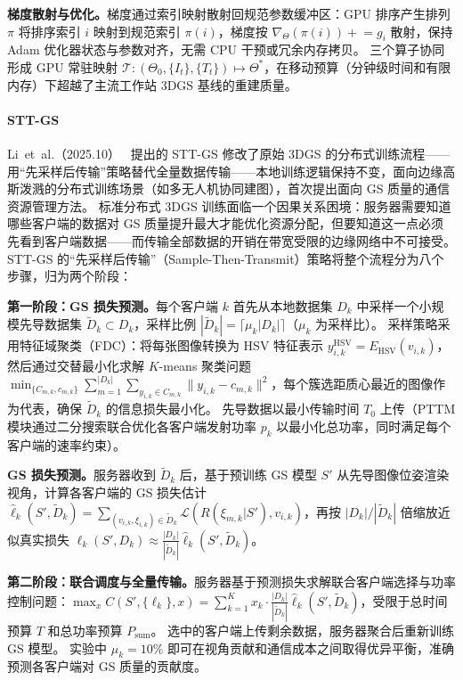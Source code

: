 \textbf{梯度散射与优化。}梯度通过索引映射散射回规范参数缓冲区：GPU 排序产生排列 $\pi$ 将排序索引 $i$ 映射到规范索引 $\pi(i)$，梯度按 $\nabla_\Theta(\pi(i)) \mathrel{+}= g_i$ 散射，保持 Adam 优化器状态与参数对齐，无需 CPU 干预或冗余内存拷贝。
三个算子协同形成 GPU 常驻映射 $\mathcal{T}: (\Theta_0, \{I_t\}, \{T_t\}) \mapsto \Theta^*$，在移动预算（分钟级时间和有限内存）下超越了主流工作站 3DGS 基线的重建质量。

\paragraph{STT-GS}
Li~et~al.（2025.10）~\cite{2510_13186} 提出的 STT-GS 修改了原始 3DGS 的分布式训练流程——用“先采样后传输”策略替代全量数据传输——本地训练逻辑保持不变，面向边缘高斯泼溅的分布式训练场景（如多无人机协同建图），首次提出面向 GS 质量的通信资源管理方法。
标准分布式 3DGS 训练面临一个因果关系困境：服务器需要知道哪些客户端的数据对 GS 质量提升最大才能优化资源分配，但要知道这一点必须先看到客户端数据——而传输全部数据的开销在带宽受限的边缘网络中不可接受。
STT-GS 的``先采样后传输''（Sample-Then-Transmit）策略将整个流程分为八个步骤，归为两个阶段：

\textbf{第一阶段：GS 损失预测。}每个客户端 $k$ 首先从本地数据集 $D_k$ 中采样一个小规模先导数据集 $\tilde{D}_k \subset D_k$，采样比例 $|\tilde{D}_k| = \lceil \mu_k |D_k| \rceil$（$\mu_k$ 为采样比）。
采样策略采用特征域聚类（FDC）：将每张图像转换为 HSV 特征表示 $y_{i,k}^\text{HSV} = E_\text{HSV}(v_{i,k})$，然后通过交替最小化求解 $K$-means 聚类问题 $\min_{\{C_{m,k}, c_{m,k}\}} \sum_{m=1}^{|D_k|} \sum_{y_{i,k} \in C_{m,k}} \|y_{i,k} - c_{m,k}\|^2$，每个簇选距质心最近的图像作为代表，确保 $\tilde{D}_k$ 的信息损失最小化。
先导数据以最小传输时间 $T_0$ 上传（PTTM 模块通过二分搜索联合优化各客户端发射功率 $p_k$ 以最小化总功率，同时满足每个客户端的速率约束）。

\textbf{GS 损失预测。}服务器收到 $\tilde{D}_k$ 后，基于预训练 GS 模型 $S'$ 从先导图像位姿渲染视角，计算各客户端的 GS 损失估计 $\hat{\ell}_k(S', \tilde{D}_k) = \sum_{(v_{i,k}, \xi_{i,k}) \in \tilde{D}_k} \mathcal{L}(R(\xi_{m,k}|S'), v_{i,k})$，再按 $|D_k|/|\tilde{D}_k|$ 倍缩放近似真实损失 $\ell_k(S', D_k) \approx \frac{|D_k|}{|\tilde{D}_k|} \hat{\ell}_k(S', \tilde{D}_k)$。

\textbf{第二阶段：联合调度与全量传输。}服务器基于预测损失求解联合客户端选择与功率控制问题：$\max_x C(S', \{\ell_k\}, x) = \sum_{k=1}^K x_k \cdot \frac{|D_k|}{|\tilde{D}_k|} \hat{\ell}_k(S', \tilde{D}_k)$，受限于总时间预算 $T$ 和总功率预算 $P_\text{sum}$。
选中的客户端上传剩余数据，服务器聚合后重新训练 GS 模型。
实验中 $\mu_k = 10\%$ 即可在视角贡献和通信成本之间取得优异平衡，准确预测各客户端对 GS 质量的贡献度。

